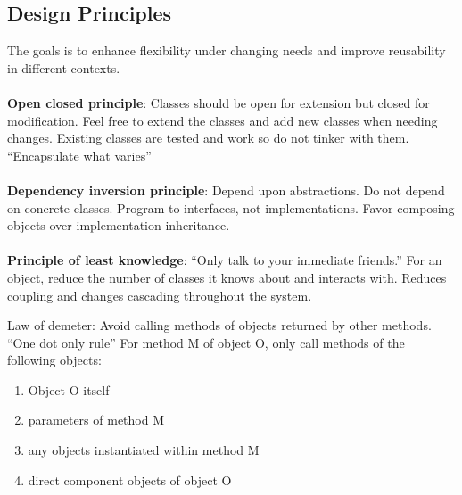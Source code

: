 \documentclass[8pt, letterpaper, titlepage]{article}
\begin{document}
\begin{multicols*}{2}
    \subsection*{Design Principles}
    The goals is to enhance flexibility under changing needs and improve reusability in different contexts. \\\\
    \textbf{Open closed principle}: Classes should be open for extension but closed for modification. Feel free to extend the classes and add new classes when needing changes. Existing classes are tested and work so do not tinker with them. ``Encapsulate what varies'' \\\\
    \textbf{Dependency inversion principle}: Depend upon abstractions. Do not depend on concrete classes. Program to interfaces, not implementations. Favor composing objects over implementation inheritance. \\\\
    \textbf{Principle of least knowledge}: ``Only talk to your immediate friends.'' For an object, reduce the number of classes it knows about and interacts with. Reduces coupling and changes cascading throughout the system.

    Law of demeter:
    Avoid calling methods of objects returned by other methods. ``One dot only rule''
    For method M of object O, only call methods of the following objects:
    \begin{enumerate}
        \item Object O itself
        \item parameters of method M
        \item any objects instantiated within method M
        \item direct component objects of object O
    \end{enumerate}
\end{multicols*}
\end{document}
